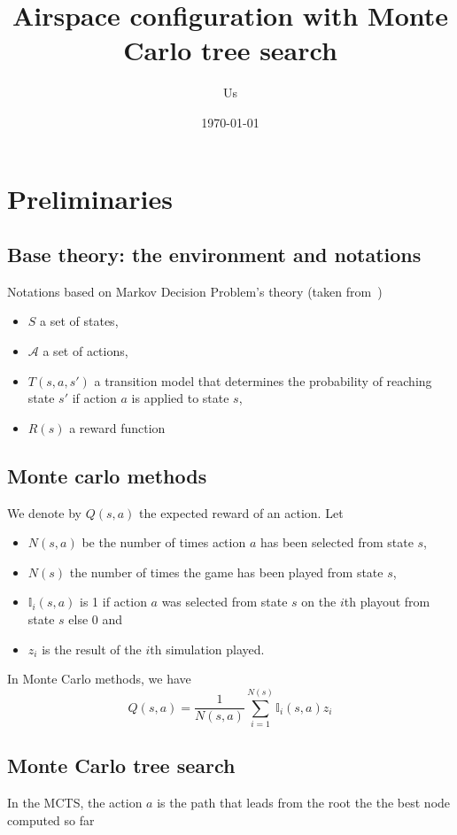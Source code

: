 \documentclass{article}
\title{Airspace configuration with Monte Carlo tree search}
\author{Us}
\date{\today}
\begin{document}
\maketitle

\section{Preliminaries}
\subsection{Base theory: the environment and notations}
Notations based on Markov Decision Problem's theory (taken
from~\cite{browne2012survey})
\begin{itemize}
  \item \(S\) a set of states,
  \item \(\mathcal{A}\) a set of actions,
  \item \(T(s, a, s')\) a transition model that determines the probability of
      reaching state \(s'\) if action \(a\) is applied to state \(s\),
  \item \(R(s)\) a reward function
\end{itemize}

\subsection{Monte carlo methods~\cite{browne2012survey}}
We denote by \(Q(s, a)\) the expected reward of an action. Let
\begin{itemize}
  \item \(N(s, a)\) be
    the number of times action \(a\) has been selected from state \(s\),
  \item \(N(s)\) the number of times the game has been played from state \(s\),
  \item \(\mathbb{I}_i(s, a)\) is 1 if action \(a\) was selected from state
    \(s\) on the \(i\)th playout from state \(s\) else 0 and
  \item \(z_i\) is the result of the \(i\)th simulation played.
\end{itemize}
In Monte Carlo methods, we have
\begin{equation}
  Q(s, a) = \frac{1}{N(s, a)}\sum_{i = 1}^{N(s)}\mathbb{I}_i(s, a)z_i
\end{equation}

\subsection{Monte Carlo tree search}
In the MCTS, the action \(a\) is the path that leads from the root the the best
node computed so far



\end{document}
